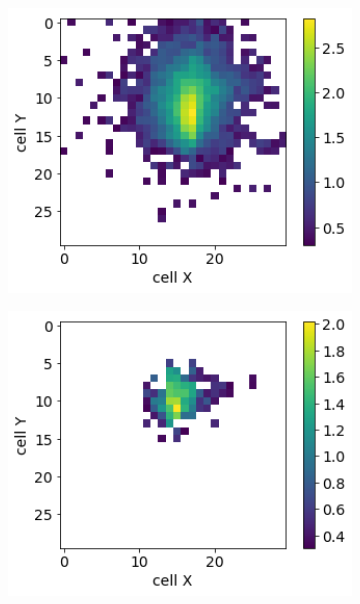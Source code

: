 \documentclass{PoS}
\begin{document}
\begin{figure}
\begin{subfigure}{0.24\textwidth}
    \includegraphics[width=1\textwidth]{figures/1_gen.png}
  \end{subfigure}
  \begin{subfigure}{0.24\textwidth}
    \centering
    \includegraphics[width=1\textwidth]{figures/2_gen.png}
  \end{subfigure}
    \begin{subfigure}{0.24\textwidth}
    \centering

\end{subfigure}
\end{figure}
\end{document}
